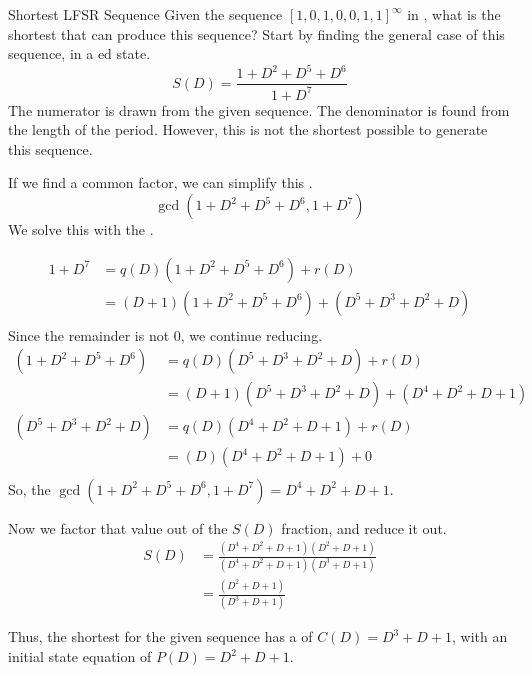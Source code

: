 \begin{example}{Shortest LFSR Sequence}
  Given the sequence ${[1, 0, 1, 0, 0, 1, 1]}^{\infty}$ in , what is the shortest  that can produce this sequence?
  \tcblower{}
  Start by finding the general case of this sequence, in a ed state.
  \begin{equation*}
    S(D) = \frac{1+D^{2}+D^{5}+D^{6}}{1+D^{7}}
  \end{equation*}
  The numerator is drawn from the given sequence.
  The denominator is found from the length of the period.
  However, this is not the shortest  possible to generate this sequence.

  If we find a common factor, we can simplify this .
  \begin{equation*}
    \gcd(1+D^{2}+D^{5}+D^{6}, 1+D^{7})
  \end{equation*}
  We solve this with the .

  \begin{align*}
    1+D^{7} &= q(D) \left( 1+D^{2}+D^{5}+D^{6} \right) + r(D) \\
    &= \left( D+1 \right) \left( 1+D^{2}+D^{5}+D^{6} \right) + \left( D^{5}+D^{3}+D^{2}+D \right) \\
  \end{align*}
  Since the remainder is not 0, we continue reducing.
  \begin{align*}
    \left( 1+D^{2}+D^{5}+D^{6} \right) &= q(D) \left( D^{5}+D^{3}+D^{2}+D \right) + r(D) \\
                                       &= \left( D+1 \right) \left( D^{5}+D^{3}+D^{2}+D \right) + \left( D^{4}+D^{2}+D+1 \right) \\
    \left( D^{5}+D^{3}+D^{2}+D \right) &= q(D) \left( D^{4}+D^{2}+D+1 \right) + r(D) \\
    &= (D) \left( D^{4}+D^{2}+D+1 \right) + 0 \\
  \end{align*}
  So, the $\gcd(1+D^{2}+D^{5}+D^{6}, 1+D^{7}) = D^{4}+D^{2}+D+1$.

  Now we factor that value out of the $S(D)$ fraction, and reduce it out.
  \begin{align*}
    S(D) &= \frac{\left( D^{4}+D^{2}+D+1 \right) \left( D^{2}+D+1 \right)}{\left( D^{4}+D^{2}+D+1 \right) \left( D^{3}+D+1\right)} \\
    &= \frac{\left( D^{2}+D+1 \right)}{\left( D^{3}+D+1\right)}
  \end{align*}

  Thus, the shortest  for the given sequence has a  of $C(D) = D^{3}+D+1$, with an initial state  equation of $P(D) = D^{2}+D+1$.
\end{example}

